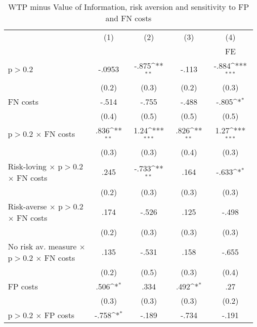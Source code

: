 \begin{table}[htbp]\centering
\def\sym#1{\ifmmode^{#1}\else\(^{#1}\)\fi}
\caption{WTP minus Value of Information, risk aversion and sensitivity to FP and FN costs}
\begin{tabular}{l*{4}{c}}
\hline\hline
                &\multicolumn{1}{c}{(1)}&\multicolumn{1}{c}{(2)}&\multicolumn{1}{c}{(3)}&\multicolumn{1}{c}{(4)}\\
                &\multicolumn{1}{c}{}&\multicolumn{1}{c}{}&\multicolumn{1}{c}{}&\multicolumn{1}{c}{FE}\\
\hline
p$>$0.2         &   -.0953         &    -.875\sym{**} &    -.113         &    -.884\sym{***}\\
                &    (0.2)         &    (0.3)         &    (0.2)         &    (0.3)         \\
FN costs        &    -.514         &    -.755         &    -.488         &    -.805\sym{*}  \\
                &    (0.4)         &    (0.5)         &    (0.5)         &    (0.5)         \\
p$>$0.2 $\times$ FN costs&     .836\sym{**} &     1.24\sym{***}&     .826\sym{**} &     1.27\sym{***}\\
                &    (0.3)         &    (0.3)         &    (0.4)         &    (0.3)         \\
Risk-loving $\times$ p$>$0.2 $\times$ FN costs&     .245         &    -.733\sym{**} &     .164         &    -.633\sym{*}  \\
                &    (0.2)         &    (0.3)         &    (0.3)         &    (0.3)         \\
Risk-averse $\times$ p$>$0.2 $\times$ FN costs&     .174         &    -.526         &     .125         &    -.498         \\
                &    (0.2)         &    (0.3)         &    (0.3)         &    (0.3)         \\
No risk av. measure $\times$ p$>$0.2 $\times$ FN costs&     .135         &    -.531         &     .158         &    -.655         \\
                &    (0.2)         &    (0.5)         &    (0.3)         &    (0.4)         \\
FP costs        &     .506\sym{*}  &     .334         &     .492\sym{*}  &      .27         \\
                &    (0.3)         &    (0.3)         &    (0.3)         &    (0.2)         \\
p$>$0.2 $\times$ FP costs&    -.758\sym{*}  &    -.189         &    -.734         &    -.191         \\

\end{tabular}
\end{table}
